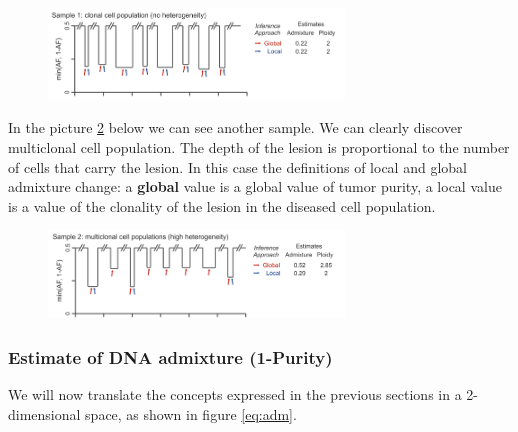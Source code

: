\begin{figure}[htbp!]
	\centering
	\includegraphics[width=0.7\textwidth]{sample1.png}
	\caption{\label{fig:sample1}}
\end{figure}

In the picture \ref{fig:sample2} below we can see another sample.
We can clearly discover multiclonal cell population. The depth of the lesion is proportional to the number of cells that carry the lesion.
In this case the definitions of local and global admixture change: a \textbf{global} value is a global value of tumor purity, a local value is a value of the clonality of the lesion in the diseased cell population.

\begin{figure}[htbp!]
	\centering
	\includegraphics[width=0.7\textwidth]{sample2.png}
	\caption{\label{fig:sample2} }
\end{figure}

\subsubsection{Estimate of DNA admixture (1-Purity)}
We will now translate the concepts expressed in the previous sections in a 2-dimensional space, as shown in figure \ref{eq:adm}.

